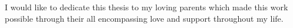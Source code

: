 
\begin{dedication} 

I would like to dedicate this thesis to my loving parents which made this work possible through their all encompassing love and support throughout my life.

\end{dedication}

